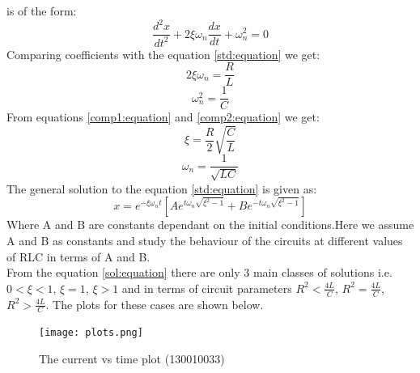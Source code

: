 \documentclass[12pt,a4paper]{report}
\begin{document}
is of the form:
\begin{equation}
\frac{d^2x}{dt^2}+2\xi \omega_n\frac{dx}{dt}+\omega_n ^2=0
\label{std:equation}
\end{equation}
Comparing coefficients with the equation \textcolor{blue}{\ref{std:equation}} we get:
\begin{equation}
2\xi\omega_n=\frac{R}{L}
\label{comp1:equation}
\end{equation}
\begin{equation}
\omega_n ^2=\frac{1}{C}
\label{comp2:equation}
\end{equation}
From equations \textcolor{blue}{\ref{comp1:equation}} and \textcolor{blue}{\ref{comp2:equation}} we get:
\begin{equation}
\xi=\frac{R}{2}\sqrt{\frac{C}{L}}
\label{compres1:equation}
\end{equation}
\begin{equation}
\omega_n=\frac{1}{\sqrt{LC}}
\label{compres2:equation}
\end{equation}
The general solution to the equation \textcolor{blue}{\ref{std:equation}} is given as:
\begin{equation}
x=e^{-\xi\omega_nt} [Ae^{t\omega_n\sqrt{\xi^2 - 1}}+Be^{-t\omega_n\sqrt{\xi^2 - 1}}]
\label{sol:equation}
\end{equation}
Where A and B are constants dependant on the initial conditions.Here we assume A and B as constants
and study the behaviour of the circuits at different values of RLC in terms of A and B.\\ From the equation
\textcolor{blue}{\ref{sol:equation}} there are only 3 main classes of solutions i.e. $0<\xi<1$, $\xi=1$, $\xi>1$
and in terms of circuit parameters $R^2<\frac{4L}{C}$, $R^2=\frac{4L}{C}$, $R^2>\frac{4L}{C}$. The plots for
these cases are shown below.
\begin{figure}[ht!]
\texttt{[image: plots.png]}
\caption{The current vs time plot (130010033)}
\label{fig:plot}
\end{figure}
\end{document}
